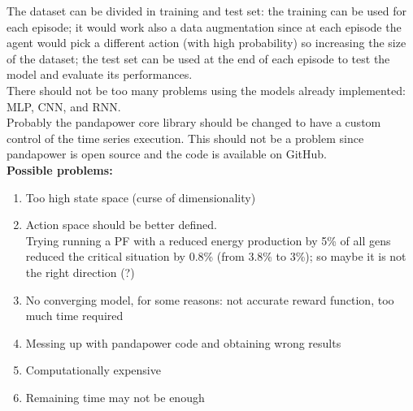 The dataset can be divided in training and test set: the training can be used for each episode; it would work also a data augmentation since at each episode the agent would pick a different action (with high probability) so increasing the size of the dataset; the test set can be used at the end of each episode to test the model and evaluate its performances. \\

There should not be too many problems using the models already implemented: MLP, CNN, and RNN.\\

Probably the pandapower core library should be changed to have a custom control of the time series execution. This should not be a problem since pandapower is open source and the code is available on GitHub. \\

\noindent \textbf{Possible problems:}
\begin{enumerate}
    \item Too high state space (curse of dimensionality)
    \item Action space should be better defined.\\
    Trying running a PF with a reduced energy production by 5\% of all gens reduced the critical situation by 0.8\% (from 3.8\% to 3\%); so maybe it is not the right direction (?)
    \item No converging model, for some reasons: not accurate reward function, too much time required
    \item Messing up with pandapower code and obtaining wrong results
    \item Computationally expensive
    \item Remaining time may not be enough
\end{enumerate}

